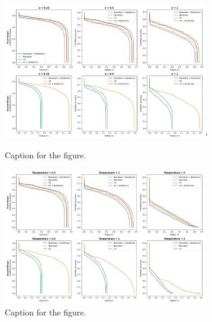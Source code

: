 \begin{figure}[htbp]
    \centering
    \includegraphics[width=0.8\textwidth]{images/cont_sigma_imagenet}`
    \caption{Caption for the figure.}
    \label{fig:cont_sigma_imagenet}
\end{figure}
\begin{figure}[htbp]
    \centering
    \includegraphics[width=0.8\textwidth]{images/cont_temp_imagenet}
    \caption{Caption for the figure.}
    \label{fig:cont_temp_imagenet}
\end{figure}
